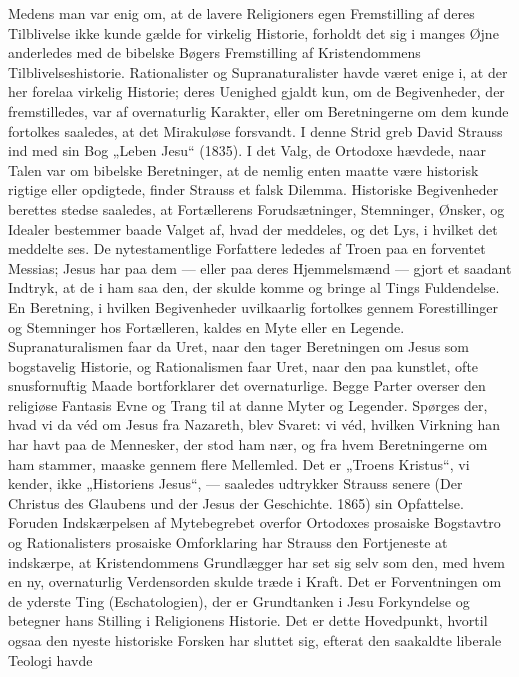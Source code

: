 \documentclass[12pt,a4paper,openany]{book}
\newcommand{\opage}[1]{\marginnote{\footnotesize\textit{[#1]}}}
\begin{document}
Medens man var enig om, at de lavere Religioners egen Fremstilling
af deres Tilblivelse ikke kunde gælde for virkelig Historie, forholdt
det sig i manges Øjne anderledes med de bibelske Bøgers Fremstilling
af Kristendommens Tilblivelseshistorie. Rationalister og Supranaturalister
havde været enige i, at der her forelaa virkelig Historie;
deres Uenighed gjaldt kun, om de Begivenheder, der fremstilledes,
var af overnaturlig Karakter, eller om Beretningerne om
dem kunde fortolkes saaledes, at det Mirakuløse forsvandt. I denne
Strid greb David Strauss ind med sin Bog „Leben Jesu“ (1835). I det
Valg, de Ortodoxe hævdede, naar Talen var om bibelske Beretninger,
at de nemlig enten maatte være historisk rigtige eller opdigtede,
finder Strauss et falsk Dilemma. Historiske Begivenheder berettes
stedse saaledes, at Fortællerens Forudsætninger, Stemninger, Ønsker,
og Idealer bestemmer baade Valget af, hvad der meddeles, og det
Lys, i hvilket det meddelte ses. De nytestamentlige Forfattere lededes
af Troen paa en forventet Messias; Jesus har paa dem --- eller
paa deres Hjemmelsmænd --- gjort et saadant Indtryk, at de i ham
saa den, der skulde komme og bringe al Tings Fuldendelse. En Beretning,
i hvilken Begivenheder uvilkaarlig fortolkes gennem Forestillinger
og Stemninger hos Fortælleren, kaldes en Myte eller en Legende.
Supranaturalismen faar da Uret, naar den tager Beretningen
om Jesus som bogstavelig Historie, og Rationalismen faar Uret, naar
den paa kunstlet, ofte snusfornuftig Maade bortforklarer det overnaturlige.
Begge Parter overser den religiøse Fantasis Evne og Trang
til at danne Myter og Legender. Spørges der, hvad vi da véd om
Jesus fra Nazareth, blev Svaret: vi véd, hvilken Virkning han har
havt paa de Mennesker, der stod ham nær, og fra hvem Beretningerne
om ham stammer, maaske gennem flere Mellemled. Det er
„Troens Kristus“, vi kender, ikke „Historiens Jesus“, --- saaledes
udtrykker Strauss senere (Der Christus des Glaubens und der Jesus
der Geschichte. 1865) sin Opfattelse. Foruden Indskærpelsen af Mytebegrebet
overfor Ortodoxes prosaiske Bogstavtro og Rationalisters
prosaiske Omforklaring har Strauss den Fortjeneste at indskærpe,
at Kristendommens Grundlægger har set sig selv som den, med hvem
en ny, overnaturlig Verdensorden skulde træde i Kraft. Det er Forventningen
om de yderste Ting (Eschatologien), der er Grundtanken
\opage{130}i Jesu Forkyndelse og betegner hans Stilling i Religionens Historie.
Det er dette Hovedpunkt, hvortil ogsaa den nyeste historiske Forsken
har sluttet sig, efterat den saakaldte liberale Teologi havde
\end{document}
